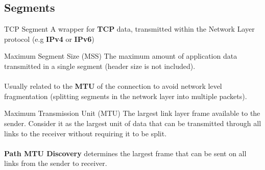 \subsection{Segments}
\begin{definitionbox}{TCP Segment}
    A wrapper for \textbf{TCP} data, transmitted within the Network Layer protocol (e.g \textbf{IPv4} or \textbf{IPv6})
\end{definitionbox}
\begin{definitionbox}{Maximum Segment Size (MSS)}
    The maximum amount of application data transmitted in a single segment (header size is not included).
    \\
    \\ Usually related to the \textbf{MTU} of the connection to avoid network level fragmentation (splitting segments in the network layer into multiple packets).
\end{definitionbox}
\begin{definitionbox}{Maximum Transmission Unit (MTU)}
    The largest link layer frame available to the sender. Consider it as the largest unit of data that can be transmitted through all links to the receiver without requiring it to be split.
    \\
    \\ \textbf{Path MTU Discovery} determines the largest frame that can be sent on all links from the sender to receiver.
\end{definitionbox}


